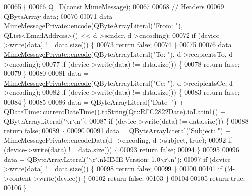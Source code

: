 \begin{DoxyCode}
00065 \{
00066     Q\_D(\textcolor{keyword}{const} \hyperlink{class_simple_mail_1_1_mime_message}{MimeMessage});
00067 
00068     \textcolor{comment}{// Headers}
00069     QByteArray data;
00070 
00071     data = \hyperlink{class_simple_mail_1_1_mime_message_private_a44bd454950e1fd6b48a29d2a7b11ca33}{MimeMessagePrivate::encode}(QByteArrayLiteral(\textcolor{stringliteral}{"From: "}), 
      QList<EmailAddress>() << d->sender, d->encoding);
00072     \textcolor{keywordflow}{if} (device->write(data) != data.size()) \{
00073         \textcolor{keywordflow}{return} \textcolor{keyword}{false};
00074     \}
00075 
00076     data = \hyperlink{class_simple_mail_1_1_mime_message_private_a44bd454950e1fd6b48a29d2a7b11ca33}{MimeMessagePrivate::encode}(QByteArrayLiteral(\textcolor{stringliteral}{"To: "}), d->recipientsTo,
       d->encoding);
00077     \textcolor{keywordflow}{if} (device->write(data) != data.size()) \{
00078         \textcolor{keywordflow}{return} \textcolor{keyword}{false};
00079     \}
00080 
00081     data = \hyperlink{class_simple_mail_1_1_mime_message_private_a44bd454950e1fd6b48a29d2a7b11ca33}{MimeMessagePrivate::encode}(QByteArrayLiteral(\textcolor{stringliteral}{"Cc: "}), d->recipientsCc,
       d->encoding);
00082     \textcolor{keywordflow}{if} (device->write(data) != data.size()) \{
00083         \textcolor{keywordflow}{return} \textcolor{keyword}{false};
00084     \}
00085 
00086     data = QByteArrayLiteral(\textcolor{stringliteral}{"Date: "}) + QDateTime::currentDateTime().toString(Qt::RFC2822Date).toLatin1() 
      + QByteArrayLiteral(\textcolor{stringliteral}{"\(\backslash\)r\(\backslash\)n"});
00087     \textcolor{keywordflow}{if} (device->write(data) != data.size()) \{
00088         \textcolor{keywordflow}{return} \textcolor{keyword}{false};
00089     \}
00090 
00091     data = QByteArrayLiteral(\textcolor{stringliteral}{"Subject: "}) + \hyperlink{class_simple_mail_1_1_mime_message_private_ae036b2417205ef25181091bebd15c0f6}{MimeMessagePrivate::encodeData}(d
      ->encoding, d->subject, \textcolor{keyword}{true});
00092     \textcolor{keywordflow}{if} (device->write(data) != data.size()) \{
00093         \textcolor{keywordflow}{return} \textcolor{keyword}{false};
00094     \}
00095 
00096     data = QByteArrayLiteral(\textcolor{stringliteral}{"\(\backslash\)r\(\backslash\)nMIME-Version: 1.0\(\backslash\)r\(\backslash\)n"});
00097     \textcolor{keywordflow}{if} (device->write(data) != data.size()) \{
00098         \textcolor{keywordflow}{return} \textcolor{keyword}{false};
00099     \}
00100 
00101     \textcolor{keywordflow}{if} (!d->content->write(device)) \{
00102         \textcolor{keywordflow}{return} \textcolor{keyword}{false};
00103     \}
00104 
00105     \textcolor{keywordflow}{return} \textcolor{keyword}{true};
00106 \}
\end{DoxyCode}


